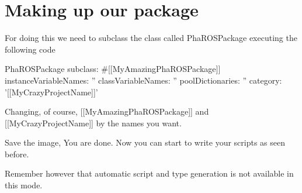 \documentclass[a4paper,10pt,twoside]{book}
\begin{document}
						
						\section{Making up our package}
						For doing this we need to subclass the class called PhaROSPackage executing the following code
						
						
						\begin{code}
							PhaROSPackage subclass: #[[MyAmazingPhaROSPackage]]
							instanceVariableNames: ''
							classVariableNames: ''
							poolDictionaries: ''
							category: '[[MyCrazyProjectName]]'
						\end{code}
						
						
						Changing, of course, [[MyAmazingPhaROSPackage]] and [[MyCrazyProjectName]] by the names you want.
						
						
						Save the image, You are done. Now you can start to write your scripts as seen before. 
						
						Remember however that automatic script and type generation is not available in this mode.




\ifx\wholebook\relax\else
\end{document}
